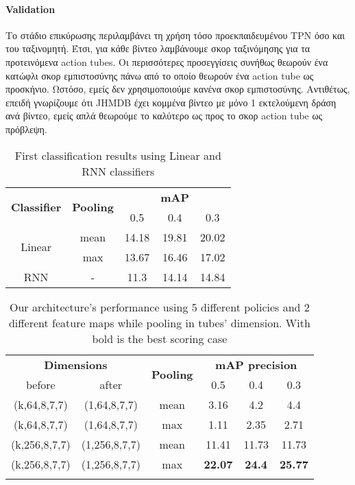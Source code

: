 \paragraph{\en Validation\gr} Το στάδιο επικύρωσης περιλαμβάνει τη χρήση τόσο προεκπαιδευμένου \en TPN \gr όσο και του ταξινομητή.
Έτσι, για κάθε βίντεο λαμβάνουμε σκορ ταξινόμησης για τα προτεινόμενα \en action tubes\gr.
Οι περισσότερες προσεγγίσεις συνήθως θεωρούν ένα κατώφλι σκορ εμπιστοσύνης πάνω από το οποίο θεωρούν ένα \en action tube \gr
 ως προσκήνιο. Ωστόσο, εμείς δεν χρησιμοποιούμε κανένα σκορ εμπιστοσύνης. Αντιθέτως, επειδή
 γνωρίζουμε ότι \en  JHMDB \gr έχει κομμένα βίντεο με μόνο 1 εκτελούμενη δράση ανά βίντεο, εμείς απλά θεωρούμε το καλύτερο ως προς το
 σκορ \en action tube \gr ως πρόβλεψη.

 \begin{table}[h]
   \en
  \centering
  \begin{tabular}{|| c | c || c  c  c ||}
    \hline
    \multirow{2}{*}{\textbf{Classifier}} & \multirow{2}{*}{\textbf{Pooling}} &  {} & \textbf{mAP} & {} \\
    {} & {} & 0.5 & 0.4 & 0.3 \\
    \hline
    \multirow{2}{*}{Linear} & mean & 14.18 & 19.81 & 20.02 \\
    \cline{2-5}
    {} & max & 13.67 & 16.46 & 17.02 \\
    \hline
    RNN  & -  & 11.3 & 14.14 & 14.84 \\
    \hline
  \end{tabular}
  \caption{First classification results using Linear and RNN classifiers}
  \label{table:gr_rnn_linear}
\end{table}

\begin{center}
  \en
\begin{longtable}{||c | c | c||c c c||}

  \hline
  \multicolumn{2}{||c|}{\textbf{Dimensions}} & \multirow{2}{*}{ \textbf{Pooling}} & \multicolumn{3}{|c||}{\textbf{mAP precision}}\\

   before & after &  {} &  0.5 &  0.4 & 0.3 \\
 \hline   \hline
 \multirow{1}{*}{(k,64,8,7,7)} & \multirow{1}{*}{(1,64,8,7,7)} & \multirow{1}{*}{mean}  &  3.16 & 4.2 & 4.4    \\
 \hline
 \multirow{1}{*}{(k,64,8,7,7)} & \multirow{1}{*}{(1,64,8,7,7)} & \multirow{1}{*}{max}   & 1.11 & 2.35 & 2.71 \\
 \hline   \hline
 \multirow{1}{*}{(k,256,8,7,7)} & \multirow{1}{*}{(1,256,8,7,7)} & \multirow{1}{*}{mean}   &  11.41 & 11.73 & 11.73 \\
 \hline
 \multirow{1}{*}{(k,256,8,7,7)} & \multirow{1}{*}{(1,256,8,7,7)} & \multirow{1}{*}{max}    & \textbf{22.07} & \textbf{24.4} &  \textbf{25.77} \\
  \hline   
  
  \caption{Our architecture's performance using 5 different policies and 2 different feature maps while pooling in
  tubes' dimension. With bold is the best scoring case}
  \label{table:gr_svm_first_results}
\end{longtable} 
\end{center}


